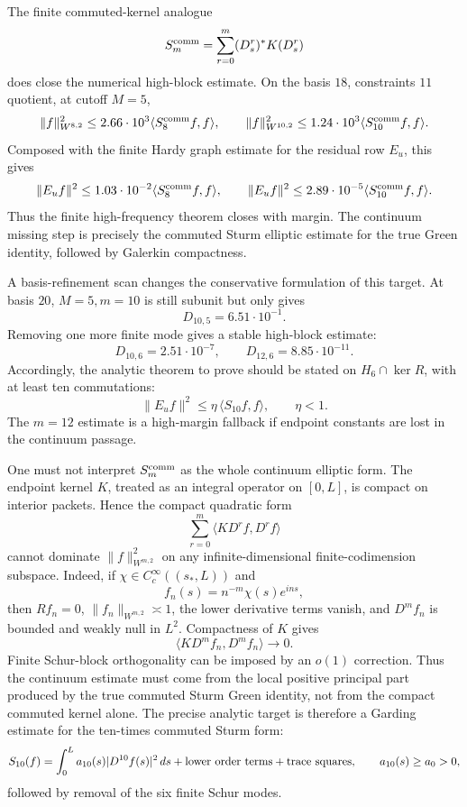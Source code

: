 \documentclass[11pt]{article}
\begin{document}
The finite commuted-kernel analogue
\[
  S_m^{\rm comm}=\sum_{r=0}^m (D_s^r)^*K(D_s^r)
\]
does close the numerical high-block estimate.  On the basis \(18\),
constraints \(11\) quotient, at cutoff \(M=5\),
\[
  \|f\|_{W^{8,2}}^2\le 2.66\cdot10^3
  \langle S_8^{\rm comm}f,f\rangle,\qquad
  \|f\|_{W^{10,2}}^2\le 1.24\cdot10^3
  \langle S_{10}^{\rm comm}f,f\rangle.
\]
Composed with the finite Hardy graph estimate for the residual row \(E_u\),
this gives
\[
  \|E_u f\|^2\le 1.03\cdot10^{-2}
  \langle S_8^{\rm comm}f,f\rangle,\qquad
  \|E_u f\|^2\le 2.89\cdot10^{-5}
  \langle S_{10}^{\rm comm}f,f\rangle .
\]
Thus the finite high-frequency theorem closes with margin.  The continuum
missing step is precisely the commuted Sturm elliptic estimate for the true
Green identity, followed by Galerkin compactness.

A basis-refinement scan changes the conservative formulation of this target.
At basis \(20\), \(M=5,m=10\) is still subunit but only gives
\[
  D_{10,5}=6.51\cdot 10^{-1}.
\]
Removing one more finite mode gives a stable high-block estimate:
\[
  D_{10,6}=2.51\cdot10^{-7},\qquad
  D_{12,6}=8.85\cdot10^{-11}.
\]
Accordingly, the analytic theorem to prove should be stated on
\(H_6\cap\ker R\), with at least ten commutations:
\[
  \|E_u f\|^2\le \eta\,\langle S_{10}f,f\rangle,\qquad
  \eta<1 .
\]
The \(m=12\) estimate is a high-margin fallback if endpoint constants are lost
in the continuum passage.

One must not interpret \(S_m^{\rm comm}\) as the whole continuum elliptic
form.  The endpoint kernel \(K\), treated as an integral operator on
\([0,L]\), is compact on interior packets.  Hence the compact quadratic form
\[
  \sum_{r=0}^m \langle K D^r f,D^r f\rangle
\]
cannot dominate \(\|f\|_{W^{m,2}}^2\) on any infinite-dimensional
finite-codimension subspace.  Indeed, if
\(\chi\in C_c^\infty((s_\ast,L))\) and
\[
  f_n(s)=n^{-m}\chi(s)e^{ins},
\]
then \(Rf_n=0\), \(\|f_n\|_{W^{m,2}}\asymp 1\), the lower derivative terms
vanish, and \(D^m f_n\) is bounded and weakly null in \(L^2\).  Compactness of
\(K\) gives
\[
  \langle K D^m f_n,D^m f_n\rangle\to0.
\]
Finite Schur-block orthogonality can be imposed by an \(o(1)\) correction.
Thus the continuum estimate must come from the local positive principal part
produced by the true commuted Sturm Green identity, not from the compact
commuted kernel alone.  The precise analytic target is therefore a Garding
estimate for the ten-times commuted Sturm form:
\[
  S_{10}(f)=\int_0^L a_{10}(s)|D^{10}f(s)|^2\,ds
  +\hbox{lower order terms}+\hbox{trace squares},
  \qquad a_{10}(s)\ge a_0>0,
\]
followed by removal of the six finite Schur modes.
\end{document}
